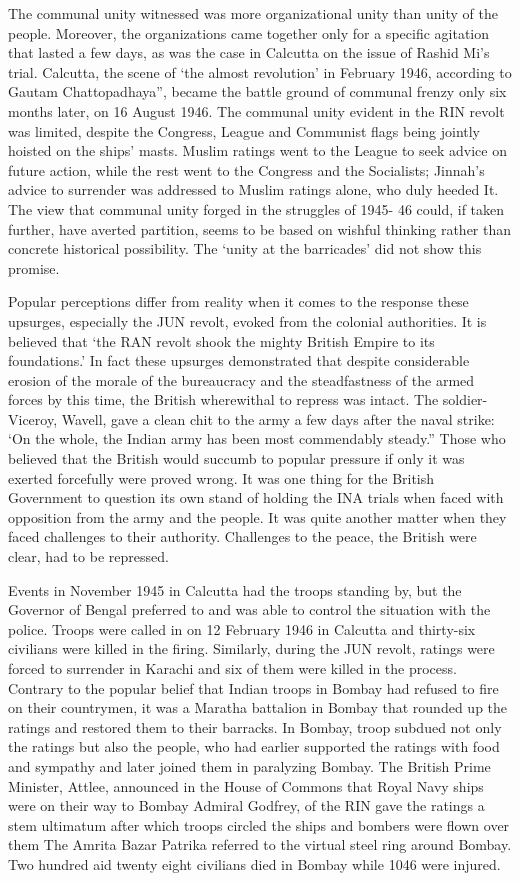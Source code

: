 The communal unity witnessed was more organizational unity than unity of the people. Moreover, the organizations came together only for a specific agitation that lasted a few days, as was the case in Calcutta on the issue of Rashid Mi’s trial. Calcutta, the scene of ‘the almost revolution’ in February 1946, according to Gautam Chattopadhaya”, became the battle ground of communal frenzy only six months later, on 16 August 1946. The communal unity evident in the RIN revolt was limited, despite the Congress, League and Communist flags being jointly hoisted on the ships’ masts. Muslim ratings went to the League to seek advice on future action, while the rest went to the Congress and the Socialists; Jinnah’s advice to surrender was addressed to Muslim ratings alone, who duly heeded It. The view that communal unity forged in the struggles of 1945- 46 could, if taken further, have averted partition, seems to be based on wishful thinking rather than concrete historical possibility. The ‘unity at the barricades’ did not show this promise. 

Popular perceptions differ from reality when it comes to the response these upsurges, especially the JUN revolt, evoked from the colonial authorities. It is believed that ‘the RAN revolt shook the mighty British Empire to its foundations.’ In fact these upsurges demonstrated that despite considerable erosion of the morale of the bureaucracy and the steadfastness of the armed forces by this time, the British wherewithal to repress was intact. The soldier-Viceroy, Wavell, gave a clean chit to the army a few days after the naval strike: ‘On the whole, the Indian army has been most commendably steady.” Those who believed that the British would succumb to popular pressure if only it was exerted forcefully were proved wrong. It was one thing for the British Government to question its own stand of holding the INA trials when faced with opposition from the army and the people. It was quite another matter when they faced challenges to their authority. Challenges to the peace, the British were clear, had to be repressed. 

Events in November 1945 in Calcutta had the troops standing by, but the Governor of Bengal preferred to and was able to control the situation with the police. Troops were called in on 12 February 1946 in Calcutta and thirty-six civilians were killed in the firing. Similarly, during the JUN revolt, ratings were forced to surrender in Karachi and six of them were killed in the process. Contrary to the popular belief that Indian troops in Bombay had refused to fire on their countrymen, it was a Maratha battalion in Bombay that rounded up the ratings and restored them to their barracks. In Bombay, troop subdued not only the ratings but also the people, who had earlier supported the ratings with food and sympathy and later joined them in paralyzing Bombay. The British Prime Minister, Attlee, announced in the House of Commons that Royal Navy ships were on their way to Bombay Admiral Godfrey, of the RIN gave the ratings a stem ultimatum after which troops circled the ships and bombers were flown over them The Amrita Bazar Patrika referred to the virtual steel ring around Bombay. Two hundred aid twenty eight civilians died in Bombay while 1046 were injured. 


